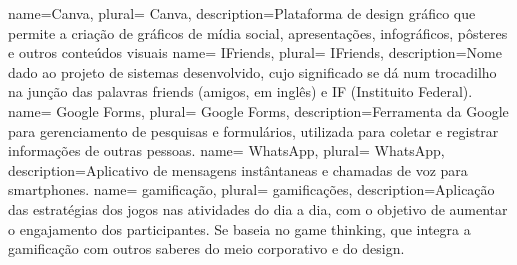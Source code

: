  {
    name=Canva,
    plural= {Canva},
    description={Plataforma de design gráfico que permite a criação de gráficos de mídia social, apresentações, infográficos, pôsteres e outros conteúdos visuais}
}
 {
    name= IFriends,
    plural= {IFriends},
    description={Nome dado ao projeto de sistemas desenvolvido, cujo significado se dá num trocadilho na junção das palavras friends (amigos, em inglês) e IF (Instituito Federal).}
}
 {
    name= Google Forms,
    plural= {Google Forms},
    description={Ferramenta da Google para gerenciamento de pesquisas e formulários, utilizada para coletar e registrar informações de outras pessoas. }
}
 {
    name= WhatsApp,
    plural= {WhatsApp},
    description={Aplicativo de mensagens instântaneas e chamadas de voz para smartphones. }
}
 {
    name= gamificação,
    plural= {gamificações},
    description={Aplicação das estratégias dos jogos nas atividades do dia a dia, com o objetivo de aumentar o engajamento dos participantes. Se baseia no game thinking, que integra a gamificação com outros saberes do meio corporativo e do design. }
}
